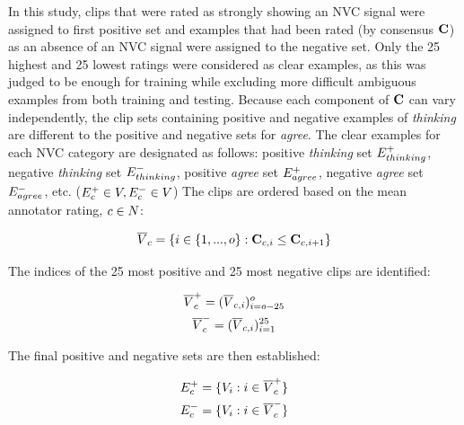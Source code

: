 In this study, clips that were rated as strongly showing an \ac{NVC} signal were assigned to first positive set and examples that had been rated (by consensus $\textbf{C}$) as an absence of an \ac{NVC} signal were assigned to the negative set. Only the 25 highest and 25 lowest ratings were considered as clear examples, as this was judged to be enough for training while excluding more difficult ambiguous examples from both training and testing. Because each component of $\textbf{C}$ can vary independently, the clip sets containing positive and negative examples of \textit{thinking} are different to the positive and negative sets for \textit{agree}. The clear examples for each \ac{NVC} category are designated as follows: positive \textit{thinking} set $E^{+}_{thinking}$, negative \textit{thinking} set $E^{-}_{thinking}$, positive \textit{agree} set $E^{+}_{agree}$, negative \textit{agree} set $E^{-}_{agree}$, etc. ($E^{+}_{c} \in V, E^{-}_{c} \in V$) The clips are ordered based on the mean annotator rating, $c \in N$:

\begin{gather}
 \overline{V}_{c} = \{i \in \{1,...,o\} : \textbf{C}_{c,i} \le \textbf{C}_{c,i+1} \}
\end{gather}

The indices of the 25 most positive and 25 most negative clips are identified:

\begin{gather}
 \overline{V}^{+}_{c} = (\overline{V}_{c,i})^{o}_{i=o-25} \\
 \overline{V}^{-}_{c} = (\overline{V}_{c,i})^{25}_{i=1}
\end{gather}

The final positive and negative sets are then established:

\begin{gather}
 E^{+}_{c} = \{V_i : i \in \overline{V}^{+}_{c}\} \\
 E^{-}_{c} = \{V_i : i \in \overline{V}^{-}_{c}\}
\end{gather}



